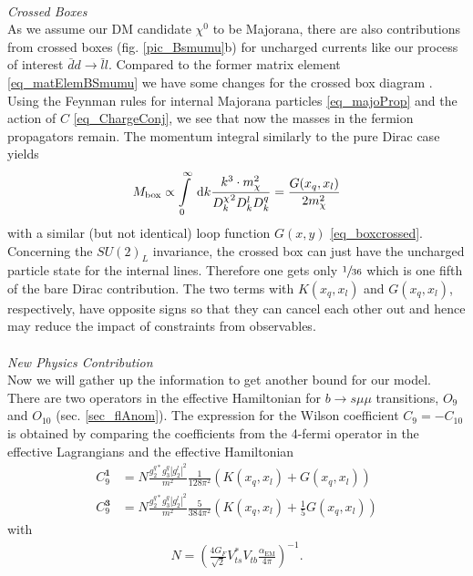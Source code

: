 \\ \textit{Crossed Boxes}\\
\noindent As we assume our DM candidate $\chi^0$ to be Majorana, there are also contributions from crossed boxes (fig. \ref{pic_Bsmumu}b) for uncharged
currents like our process of interest $\bar d d\rightarrow \bar l l$. Compared to the former matrix element \eqref{eq_matElemBSmumu} we have some changes
for the crossed box diagram \cite{1411.6743}. Using the Feynman rules for internal Majorana particles \eqref{eq_majoProp} and the action of $C$ \eqref{eq_ChargeConj}, 
we see that now the masses in the fermion propagators remain. The momentum integral similarly to the pure Dirac case yields
\begin{align}
 M_\text{box} \propto \int\limits_0^\infty \; \mathrm{d} k \frac{k^3 \cdot m_\chi^2}{{D^\chi_k}^2D^l_k D^q_k} = \frac{G(x_q,x_l)}{2m_\chi^2}
 \label{eq_crossedBox}
\end{align}
with a similar (but not identical) loop function $G(x,y)$ \eqref{eq_boxcrossed}.
Concerning the $SU(2)_L$ invariance, the crossed box can just have the uncharged particle state for the internal lines. Therefore one gets only $\sfrac{1}{36}$
which is one fifth of the bare Dirac contribution. The two terms with $K(x_q,x_l)$ and $G(x_q,x_l)$, respectively, have opposite signs so that they can cancel
each other out and hence may reduce the impact of constraints from observables.\\
\\ \textit{New Physics Contribution}\\
\noindent Now we will gather up the information to get another bound for our model. There are two operators in the effective Hamiltonian for $b\rightarrow s\mu\mu$
transitions, $O_9$ and $O_{10}$ (sec. \ref{sec_flAnom}). The expression for the Wilson coefficient $C_9 = -C_{10}$ \cite{1408.1627} is obtained by comparing the 
coefficients from the 4-fermi operator in the effective Lagrangians and the effective Hamiltonian
\begin{align}
 C_9^{\textbf{1}} &= N \frac{g_2^{q*}g_3^q|g_2^l|^2}{m^2} \frac{1}{128\pi^2} \left(K(x_q,x_l) + G(x_q,x_l)\right)\\
 C_9^{\textbf{3}} &= N \frac{g_2^{q*}g_3^q|g_2^l|^2}{m^2} \frac{5}{384\pi^2} \left(K(x_q,x_l) + \frac15 G(x_q,x_l)\right)
 \label{eq_WilsonBsmumu}
\end{align}
with
\begin{align}
 N = \left(\frac{4G_F}{\sqrt{2}} V_{ts}^*V_{tb} \frac{\alpha_\text{EM}}{4\pi}\right)^{-1}.
\end{align}

